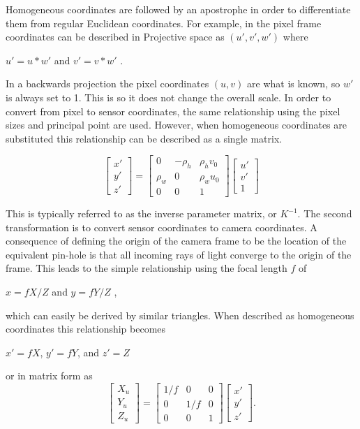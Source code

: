  Homogeneous coordinates are followed by an apostrophe in order to differentiate them from regular Euclidean coordinates.  For example, in the pixel frame coordinates can be described in Projective space as $(u',v',w')$ where 
 \begin{center}
 $u' = u*w'$ and $v'=v*w'$
 .
 \end{center}
 
 In a backwards projection the pixel coordinates $(u,v)$ are what is known, so $w'$ is always set to 1.  This is so it does not change the overall scale.  In order to convert from pixel to sensor coordinates, the same relationship using the pixel sizes and principal point are used. However, when homogeneous coordinates are substituted this relationship can be described as a single matrix.
 
 \[
 \begin{bmatrix} x' \\ y' \\ z' \end{bmatrix}
 =
 \begin{bmatrix} 
     0   & -\rho_h & \rho_h v_0 \\ 
  \rho_w &    0    & \rho_w u_0 \\
     0   &    0    &      1  
 \end{bmatrix}
 \begin{bmatrix} u' \\ v' \\ 1 \end{bmatrix}
 \]
 
 This is typically referred to as the inverse parameter matrix, or $K^{-1}$.  The second transformation is to convert sensor coordinates to camera coordinates.  A consequence of defining the origin of the camera frame to be the location of the equivalent pin-hole is that all incoming rays of light converge to the origin of the frame.  This leads to the simple relationship using the focal length $f$ of
  
  \begin{center}
  $x=fX/Z$  and $y=fY/Z$
  ,
  \end{center}
  which can easily be derived by similar triangles.  When described as homogeneous coordinates this relationship becomes 
  
  \begin{center}
  $x'=fX$, $y'=fY$, and $z'=Z$
  \end{center}
  or in matrix form as
   \[
   \begin{bmatrix} X_u \\ Y_u \\ Z_u \end{bmatrix}
   =
   \begin{bmatrix} 
       1/f &   0   &  0 \\ 
       0   &  1/f  &  0 \\
       0   &   0   &  1  
   \end{bmatrix}
   \begin{bmatrix} x' \\ y' \\ z' \end{bmatrix}
   .
   \]
  
